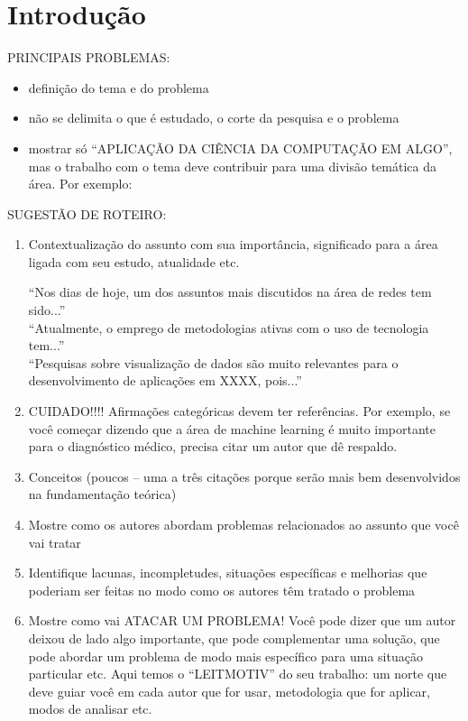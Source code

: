 \chapter[Introdução]{Introdução}
\label{cap:intro}

PRINCIPAIS PROBLEMAS:

\begin{itemize}
  \item definição do tema e do problema
  \item não se delimita o que é estudado, o corte da pesquisa e o problema
  \item mostrar só “APLICAÇÃO DA CIÊNCIA DA COMPUTAÇÃO EM ALGO”, mas o trabalho com o tema deve contribuir para uma divisão temática da área. Por exemplo:
\end{itemize}

SUGESTÃO DE ROTEIRO:
\begin{enumerate}
  \item Contextualização do assunto com sua importância, significado para a área ligada com seu estudo, atualidade etc.

        “Nos dias de hoje, um dos assuntos mais discutidos na área de redes tem sido...”\\“Atualmente, o emprego de metodologias ativas com o uso de tecnologia tem...”\\ “Pesquisas sobre visualização de dados são muito relevantes para o desenvolvimento de aplicações em XXXX, pois...”

  \item CUIDADO!!!! Afirmações categóricas devem ter referências. Por exemplo, se você começar dizendo que a área de machine learning é muito importante para o diagnóstico médico, precisa citar um autor que dê respaldo.

  \item Conceitos (poucos – uma a três citações porque serão mais bem desenvolvidos na fundamentação teórica)

  \item Mostre como os autores abordam problemas relacionados ao assunto que você vai tratar

  \item Identifique lacunas, incompletudes, situações específicas e melhorias que poderiam ser feitas no modo como os autores têm tratado o problema

  \item Mostre como vai ATACAR UM PROBLEMA! Você pode dizer que um autor deixou de lado algo importante, que pode complementar uma solução, que pode abordar um problema de modo mais específico para uma situação particular etc. Aqui temos o “LEITMOTIV” do seu trabalho: um norte que deve guiar você em cada autor que for usar, metodologia que for aplicar, modos de analisar etc.

\end{enumerate}

